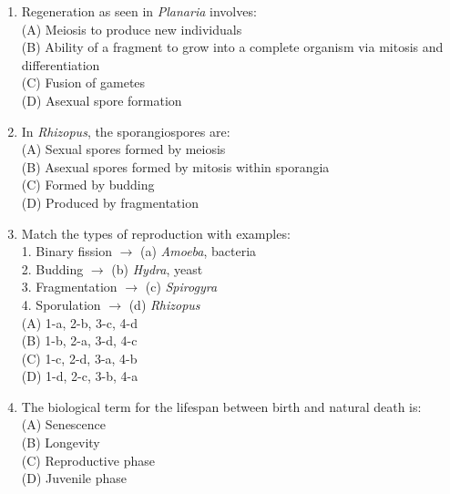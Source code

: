 \documentclass{article}
\begin{document}
\begin{enumerate}[label=Q\arabic*.]
\item Regeneration as seen in \textit{Planaria} involves:
\\(A) Meiosis to produce new individuals
\\(B) Ability of a fragment to grow into a complete organism via mitosis and differentiation
\\(C) Fusion of gametes
\\(D) Asexual spore formation

\item In \textit{Rhizopus}, the sporangiospores are:
\\(A) Sexual spores formed by meiosis
\\(B) Asexual spores formed by mitosis within sporangia
\\(C) Formed by budding
\\(D) Produced by fragmentation

\item Match the types of reproduction with examples:\\
1. Binary fission $\rightarrow$ (a) \textit{Amoeba}, bacteria\\
2. Budding $\rightarrow$ (b) \textit{Hydra}, yeast\\
3. Fragmentation $\rightarrow$ (c) \textit{Spirogyra}\\
4. Sporulation $\rightarrow$ (d) \textit{Rhizopus}
\\(A) 1-a, 2-b, 3-c, 4-d
\\(B) 1-b, 2-a, 3-d, 4-c
\\(C) 1-c, 2-d, 3-a, 4-b
\\(D) 1-d, 2-c, 3-b, 4-a

\item The biological term for the lifespan between birth and natural death is:
\\(A) Senescence
\\(B) Longevity
\\(C) Reproductive phase
\\(D) Juvenile phase

\end{enumerate}
\end{document}
